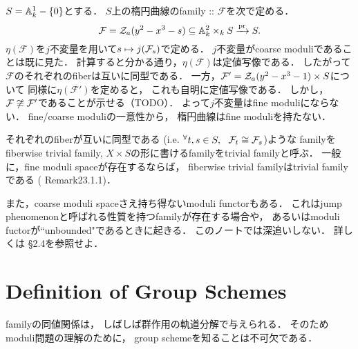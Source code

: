 \documentclass[a4paper]{jsarticle}
\newcommand{\famF}{\mathcal{F}}
\begin{document}
    \begin{Example}
        $S=\mathbb{A}^1_k-\{0\}$とする．
        $S$上の楕円曲線のfamily :: $\famF$を次で定める．
        \[
            \famF=\zerosa(y^2-x^3-s) \subseteq \affine^2_k \times_k S
            \xrightarrow{\pr} S.
        \]
        $\eta(\famF)$を$j$不変量を用いて$s \mapsto j(\mathcal{F}_s)$で定める．
        $j$不変量がcoarse moduliであることは既に見た．
        計算すると分かる通り，$\eta(\famF)$は定値写像である．
        したがって$\famF$のそれぞれのfiberは互いに同型である．
        一方，$\famF'=\zerosa(y^2-x^3-1) \times S$について
        同様に$\eta(\famF')$を定めると，
        これも自明に定値写像である．
        しかし，$\famF \not \iso \famF'$であることが示せる（TODO）．
        よって$j$不変量はfine moduliにならない．
        fine/coarse moduliの一意性から，
        楕円曲線はfine moduliを持たない．
    \end{Example}

    それぞれのfiberが互いに同型である
    (i.e. $\Forall{t,s \in S} \famF_t \iso \famF_s$)ような
    familyをfiberwise trivial family, 
    $X \times S$の形に書けるfamilyをtrivial familyと呼ぶ．
    一般に，fine moduli spaceが存在するならば，
    fiberwise trivial familyはtrivial familyである
    (\cite{HarDef} Remark23.1.1)．

    また，coarse moduli spaceさえ持ち得ないmoduli functorもある．
    これはjump phenomenonと呼ばれる性質を持つfamilyが存在する場合や，
    あるいはmoduli fuctorが``unbounded"であるときに起きる．
    このノートでは深追いしない．
    詳しくは\cite{Hos} \S 2.4を参照せよ．

\section{Definition of Group Schemes}
    familyの同値関係は，
    しばしば群作用の軌道分解で与えられる．
    そのためmoduli問題の理解のために，
    group schemeを知ることは不可欠である．
\end{document}
